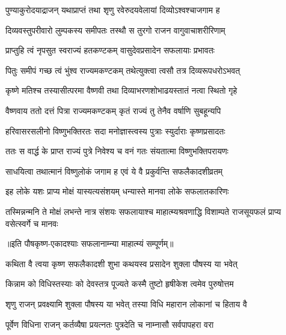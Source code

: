 \twolineshloka
{पुण्याकुरोदयाद्राजन् यथाप्राप्तं तथा शृणु}
{रवेरुदयवेलायां दिव्योऽश्वश्चाजगाम ह} %

\twolineshloka
{दिव्यवस्तुपरीवारो लुम्पकस्य समीपतः}
{तस्थौ स तुरगो राजन वागुवाचाशरीरिणाम्} %

\twolineshloka
{प्राप्तुहि त्वं नृपसुत स्वराज्यं हतकण्टकम्}
{वासुदेवप्रसादेन सफलायाः प्रभावतः} %

\twolineshloka
{पितुः समीपं गच्छ त्वं भुंश्व राज्यमकण्टकम्}
{तथेत्युक्त्वा त्वसौ तत्र दिव्यरूपधरोऽभवत्} %

\twolineshloka
{कृष्णे मतिश्च तस्यासीत्परमा वैष्णवी तथा}
{दिव्याभरणशोभाढयस्तातं नत्वा स्थितो गृहे} %

\twolineshloka
{वैष्णवाय ततो दत्तं पित्रा राज्यमकण्टकम्}
{कृतं राज्यं तु तेनैव वर्षाणि सुबहून्यपि} %

\twolineshloka
{हरिवासरसलीनो विष्णुभक्तिरतः सदा}
{मनोज्ञास्त्वस्य पुत्राः स्युर्दाराः कृष्णप्रसादतः} %

\twolineshloka
{ततः स वार्द्ध के प्राप्त राज्यं पुत्रे निवेश्य च}
{वनं गतः संयतात्मा विष्णुभक्तिपरायणः} %

\twolineshloka
{साधयित्वा तथात्मानं विष्णुलोकं जगाम ह}
{एवं ये वै प्रकुर्वन्ति सफलैकादशीव्रतम्} %

\twolineshloka
{इह लोके यशः प्राप्य मोक्षं यास्यत्यसंशयम्}
{धन्यास्ते मानवा लोके सफलातकारिणः} %


\threelineshloka
{तस्मिन्नन्मनि ते मोक्षं लभन्ते नात्र संशयः}
{सफलायाश्च माहात्म्यश्रवणाद्धि विशाम्पते}
{राजसूयफलं प्राप्य वसेत्स्वर्गे च मानवः} %

॥इति पौषकृष्ण-एकादश्याः सफलानाम्न्या माहात्म्यं सम्पूर्णम्॥


\hyperref[sec:ekadashi_mahatmyam_vrata_raja]{\closesub}
\clearpage

\label{sec:vrata-raja-pausha-shukla-putrada}


\twolineshloka
{कथिता वै त्वया कृष्ण सफलैकादशी शुभा}
{कथयस्व प्रसादेन शुक्ला पौषस्य या भवेत्} %

\twolineshloka
{किन्नाम को विधिस्तस्याः को देवस्तत्र पूज्यते}
{कस्मै तुष्टो हृषीकेश त्वमेव पुरुषोत्तम} %


\twolineshloka
{शृणु राजन् प्रवक्ष्यामि शुक्ला पौषस्य या भवेत्}
{तस्या विधि महारान लोकानां च हिताय वै} %

\twolineshloka
{पूर्वेण विधिना राजन् कर्तव्यैषा प्रयत्नतः}
{पुत्रदेति च नाम्नासौ सर्वपापहरा वरा} %


